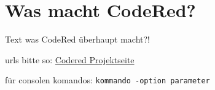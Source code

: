 \chapter{Was macht CodeRed?}  %
\label{chapter:Was macht CodeRed?}  %

Text was CodeRed überhaupt macht?!


urls bitte so:
\href{http://codered.berlios.de}{Codered Projektseite}


für consolen komandos:
\verb|kommando -option parameter|


